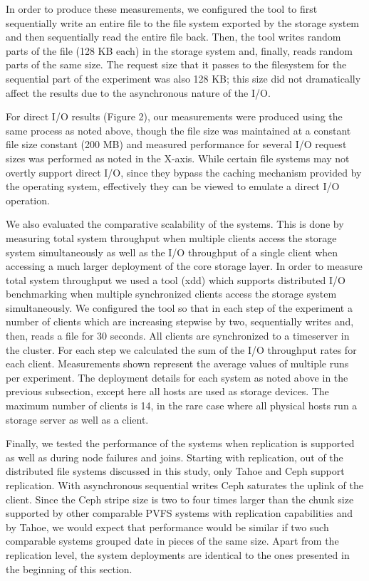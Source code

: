 \documentclass[11pt]{article}
\begin{document}
In order to produce these measurements, we configured the tool to first 
sequentially write an entire file to the file system exported by the storage 
system and then sequentially read the entire file back. Then, the tool writes 
random parts of the file (128 KB each) in the storage system and, finally, 
reads random parts of the same size. The request size that it passes to the 
filesystem for the sequential part of the experiment was also 128 KB; this 
size did not dramatically affect the results due to the asynchronous nature 
of the I/O. 

For direct I/O results (Figure 2), our measurements were produced using 
the same process as noted above, though the file size was maintained at 
a constant file size constant (200 MB) and measured performance for several 
I/O request sizes was performed as noted in the X-axis. While certain file 
systems may not overtly support direct I/O, since they bypass the caching 
mechanism provided by the operating system, effectively they can be viewed 
to emulate a direct I/O operation.

We also evaluated the comparative scalability of the systems. This is 
done by measuring total system throughput when multiple clients access 
the storage system simultaneously as well as the I/O throughput of a 
single client when accessing a much larger deployment of the core storage 
layer. In order to measure total system throughput we used a tool (xdd) 
which supports distributed I/O benchmarking when multiple synchronized 
clients access the storage system simultaneously. We configured the tool 
so that in each step of the experiment a number of clients which are 
increasing stepwise by two, sequentially writes and, then, reads a file 
for 30 seconds. All clients are synchronized to a timeserver in the 
cluster. For each step we calculated the sum of the I/O throughput rates 
for each client. Measurements shown represent the average values of 
multiple runs per experiment. The deployment details for each system as 
noted above in the previous subsection, except here all  hosts are used 
as storage devices. The maximum number of clients is 14, in the rare case 
where all physical hosts run a storage server as well as a client.

Finally, we tested the performance of the systems when replication is 
supported as well as during node failures and joins. Starting with 
replication, out of the distributed file systems discussed in this study, 
only Tahoe and Ceph support replication. With asynchronous sequential 
writes Ceph saturates the uplink of the client. Since the Ceph stripe size 
is two to four times larger than the chunk size supported by other 
comparable PVFS systems with replication capabilities and by Tahoe, we 
would expect that performance would be similar if two such comparable 
systems grouped date in pieces of the same size. Apart from the 
replication level, the system deployments are identical to the ones 
presented in the beginning of this section.
\end{document}
